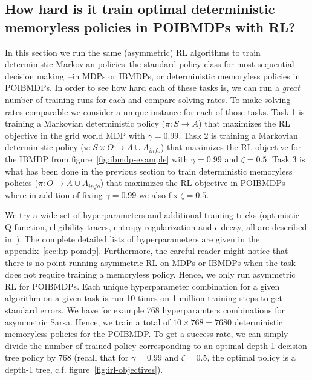 \subsection{How hard is it train optimal deterministic memoryless policies in POIBMDPs with RL?}\label{sec:how-diff}

In this section we run the same (asymmetric) RL algorithms to train deterministic Markovian policies--the standard policy class for most sequential decision making~\citep{sutton}--in MDPs or IBMDPs, or deterministic memoryless policies in POIBMDPs.
In order to see how hard each of these tasks is, we can run a \textit{great} number of training runs for each and compare solving rates.
To make solving rates comparable we consider a unique instance for each of those tasks.
Task 1 is training a Markovian deterministic policy ($\pi: S\rightarrow A$) that maximizes the RL objective in the grid world MDP with $\gamma=0.99$.
Task 2 is training a Markovian deterministic policy ($\pi: S\times O \rightarrow A \cup A_{info}$) that maximizes the RL objective for the IBMDP from figure~\ref{fig:ibmdp-example} with $\gamma=0.99$ and $\zeta=0.5$.
Task 3 is what has been done in the previous section to train deterministic memoryless policies ($\pi: O \rightarrow A \cup A_{info}$) that maximizes the RL objective in POIBMDPs where in addition of fixing $\gamma=0.99$ we also fix $\zeta=0.5$.

We try a wide set of hyperparameters and additional training tricks (optimistic Q-function, eligibility traces, entropy regularization and $\epsilon$-decay, all are described in~\cite{sutton}).
The complete detailed lists of hyperparameters are given in the appendix~\ref{sec:hp-pomdp}.
Furthermore, the careful reader might notice that there is no point running asymmetric RL on MDPs or IBMDPs when the task does not require training a memoryless policy.
Hence, we only run asymmetric RL for POIBMDPs. Each unique hyperparameter combination for a given algorithm on a given task is run 10 times on 1 million training steps to get standard errors.
We have for example 768 hyperparamters combinations for asymmetric Sarsa. Hence, we train a total of $10\times 768 = 7680$ deterministic memoryless policies for the POIBMDP.
To get a success rate, we can simply divide the number of trained policy corresponding to an optimal depth-1 decision tree policy by 768 (recall that for $\gamma=0.99$ and $\zeta=0.5$, the optimal policy is a depth-1 tree, c.f. figure~\ref{fig:irl-objectives}). 



